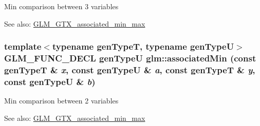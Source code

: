 Min comparison between 3 variables \begin{Desc}
\item[See also:]\hyperlink{group__gtx__associated__min__max}{GLM\_\-GTX\_\-associated\_\-min\_\-max} \end{Desc}
\hypertarget{group__gtx__associated__min__max_ge85252492710f54ac1ba963a3468a6d6}{
\subsubsection[associatedMin]{\setlength{\rightskip}{0pt plus 5cm}template$<$typename genTypeT, typename genTypeU$>$ GLM\_\-FUNC\_\-DECL genTypeU glm::associatedMin (const genTypeT \& {\em x}, \/  const genTypeU \& {\em a}, \/  const genTypeT \& {\em y}, \/  const genTypeU \& {\em b})}}
\label{group__gtx__associated__min__max_ge85252492710f54ac1ba963a3468a6d6}


Min comparison between 2 variables \begin{Desc}
\item[See also:]\hyperlink{group__gtx__associated__min__max}{GLM\_\-GTX\_\-associated\_\-min\_\-max} \end{Desc}
